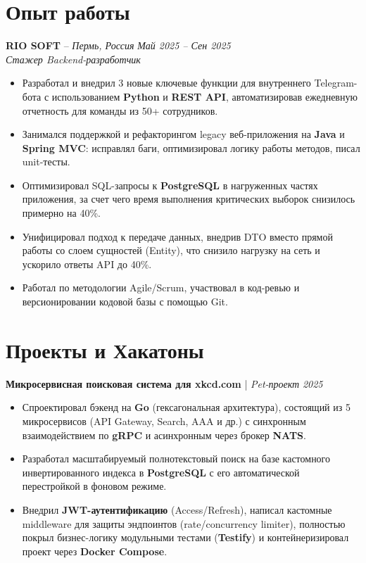 \documentclass[11pt,a4paper]{article}
\begin{document}
\section{Опыт работы}
\textbf{RIO SOFT} -- \textit{Пермь, Россия} \hfill \textit{Май 2025 -- Сен 2025} \\
\textit{Стажер Backend-разработчик}
\begin{itemize}[leftmargin=0.5cm, itemsep=2pt, topsep=2pt]
    \item Разработал и внедрил 3 новые ключевые функции для внутреннего Telegram-бота с использованием \textbf{Python} и \textbf{REST API}, автоматизировав ежедневную отчетность для команды из 50+ сотрудников.
    \item Занимался поддержкой и рефакторингом legacy веб-приложения на \textbf{Java} и \textbf{Spring MVC}: исправлял баги, оптимизировал логику работы методов, писал unit-тесты.
    \item Оптимизировал SQL-запросы к \textbf{PostgreSQL} в нагруженных частях приложения, за счет чего время выполнения критических выборок снизилось примерно на 40\%.
    \item Унифицировал подход к передаче данных, внедрив DTO вместо прямой работы со слоем сущностей (Entity), что снизило нагрузку на сеть и ускорило ответы API до 40\%.
    \item Работал по методологии Agile/Scrum, участвовал в код-ревью и версионировании кодовой базы с помощью Git.
\end{itemize}

\section{Проекты и Хакатоны}

\textbf{Микросервисная поисковая система для xkcd.com} | \textit{Pet-проект} \hfill \textit{2025}
\begin{itemize}[leftmargin=0.5cm, itemsep=0pt, topsep=2pt]
    \item Спроектировал бэкенд на \textbf{Go} (гексагональная архитектура), состоящий из 5 микросервисов (API Gateway, Search, AAA и др.) с синхронным взаимодействием по \textbf{gRPC} и асинхронным через брокер \textbf{NATS}.
    \item Разработал масштабируемый полнотекстовый поиск на базе кастомного инвертированного индекса в \textbf{PostgreSQL} с его автоматической перестройкой в фоновом режиме.
    \item Внедрил \textbf{JWT-аутентификацию} (Access/Refresh), написал кастомные middleware для защиты эндпоинтов (rate/concurrency limiter), полностью покрыл бизнес-логику модульными тестами (\textbf{Testify}) и контейнеризировал проект через \textbf{Docker Compose}.
\end{itemize}
\end{document}
